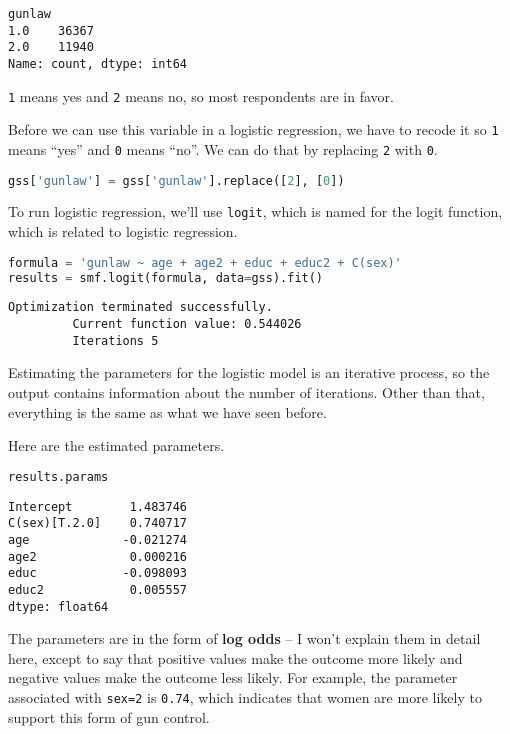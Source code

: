 \begin{lstlisting}[style=output]
gunlaw
1.0    36367
2.0    11940
Name: count, dtype: int64
\end{lstlisting}

\passthrough{\lstinline!1!} means yes and \passthrough{\lstinline!2!}
means no, so most respondents are in favor.

Before we can use this variable in a logistic regression, we have to
recode it so \passthrough{\lstinline!1!} means ``yes'' and
\passthrough{\lstinline!0!} means ``no''. We can do that by replacing
\passthrough{\lstinline!2!} with \passthrough{\lstinline!0!}.

\begin{lstlisting}[language=Python,style=source]
gss['gunlaw'] = gss['gunlaw'].replace([2], [0])
\end{lstlisting}

To run logistic regression, we'll use \passthrough{\lstinline!logit!},
which is named for the logit function, which is related to logistic
regression.

\begin{lstlisting}[language=Python,style=source]
formula = 'gunlaw ~ age + age2 + educ + educ2 + C(sex)'
results = smf.logit(formula, data=gss).fit()
\end{lstlisting}

\begin{lstlisting}[style=output]
Optimization terminated successfully.
         Current function value: 0.544026
         Iterations 5
\end{lstlisting}

Estimating the parameters for the logistic model is an iterative
process, so the output contains information about the number of
iterations. Other than that, everything is the same as what we have seen
before.

\pagebreak

Here are the estimated parameters.

\begin{lstlisting}[language=Python,style=source]
results.params
\end{lstlisting}

\begin{lstlisting}[style=output]
Intercept        1.483746
C(sex)[T.2.0]    0.740717
age             -0.021274
age2             0.000216
educ            -0.098093
educ2            0.005557
dtype: float64
\end{lstlisting}

The parameters are in the form of \textbf{log odds} -- I won't explain
them in detail here, except to say that positive values make the outcome
more likely and negative values make the outcome less likely. For
example, the parameter associated with \passthrough{\lstinline!sex=2!}
is \passthrough{\lstinline!0.74!}, which indicates that women are more
likely to support this form of gun control.

